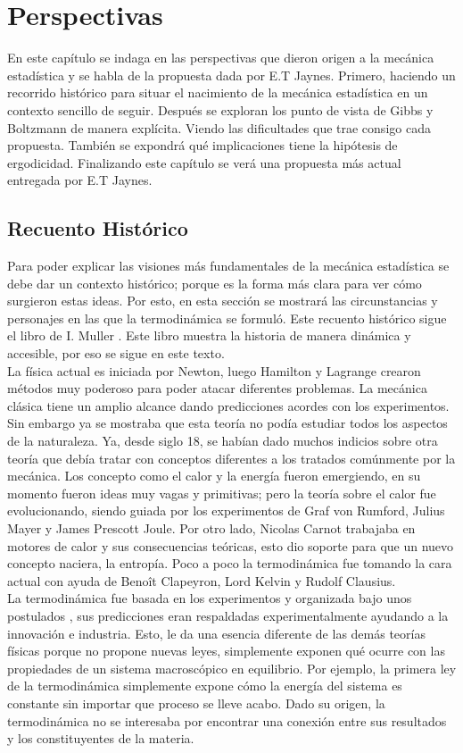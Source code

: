 \chapter{Perspectivas}

En este capítulo se indaga en las perspectivas que dieron origen a la mecánica estadística y se habla de la propuesta dada por E.T Jaynes. Primero, haciendo un recorrido histórico para situar el nacimiento de la mecánica estadística en un contexto sencillo de seguir. Después se exploran los punto de vista de Gibbs y Boltzmann de manera explícita. Viendo las dificultades que trae consigo cada propuesta. También se expondrá qué implicaciones tiene la hipótesis de ergodicidad. Finalizando este capítulo se verá una propuesta más actual entregada por E.T Jaynes.

\section{Recuento Histórico}
Para poder explicar las visiones más fundamentales de la mecánica estadística se debe dar un contexto histórico; porque es la forma más clara para ver cómo surgieron estas ideas. Por esto, en esta sección se mostrará las circunstancias y personajes en las que la termodinámica se formuló. Este recuento histórico sigue el libro de I. Muller \cite{MullerHistory}. Este libro muestra la historia de manera dinámica y accesible, por eso se sigue en este texto.
\\
La física actual es iniciada por Newton, luego Hamilton y Lagrange crearon métodos muy poderoso para poder atacar diferentes problemas. La mecánica clásica tiene un amplio alcance dando predicciones acordes con los experimentos. Sin embargo ya se mostraba que esta teoría no podía estudiar todos los aspectos de la naturaleza. Ya, desde siglo 18, se habían dado muchos indicios sobre otra teoría que debía tratar con conceptos diferentes a los tratados comúnmente por la mecánica. Los concepto como el calor y la energía fueron emergiendo, en su momento fueron ideas muy vagas y primitivas; pero la teoría sobre el calor fue evolucionando, siendo guiada por los experimentos de Graf von Rumford, Julius Mayer y James Prescott Joule. Por otro lado, Nicolas Carnot trabajaba en motores de calor y sus consecuencias teóricas, esto dio soporte para que un nuevo concepto naciera, la entropía. Poco a poco la termodinámica fue tomando la cara actual con ayuda de Benoît Clapeyron, Lord Kelvin y Rudolf Clausius. 
\\
La termodinámica fue basada en los experimentos y organizada bajo unos postulados \cite{CallenThermo}, sus predicciones eran respaldadas experimentalmente ayudando a la innovación e industria. Esto, le da una esencia diferente de las demás teorías físicas porque no propone nuevas leyes, simplemente exponen qué ocurre con las propiedades de un sistema macroscópico en equilibrio. Por ejemplo, la primera ley de la termodinámica simplemente expone cómo la energía del sistema es constante sin importar que proceso se lleve acabo. Dado su origen, la termodinámica no se interesaba por encontrar una conexión entre sus resultados y los constituyentes de la materia.
